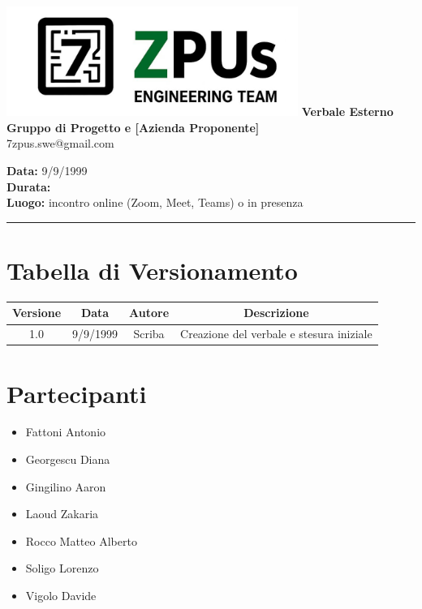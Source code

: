 \documentclass[a4paper,12pt]{article}
\begin{document}
\begin{center}
    \includegraphics[width=9.5cm]{../../images/logo7ZPUs2.jpg}
    \Large \textbf{Verbale Esterno Gruppo di Progetto e [Azienda Proponente]}\\
    \vspace{0.5cm}
    \small\hspace{10cm} 7zpus.swe@gmail.com
\end{center}


\noindent
\textbf{Data:} 9/9/1999 \\
\textbf{Durata:}  \\
\textbf{Luogo:} incontro online (Zoom, Meet, Teams) o in presenza

\vspace{0.3cm}
\hrule
\vspace{0.5cm}

\tableofcontents

\newpage

\section{Tabella di Versionamento}
    \begin{tabular}{|c|c|c|c|}
        \hline
        \textbf{Versione} & \textbf{Data} & \textbf{Autore} & \textbf{Descrizione} \\
        \hline
        1.0 & 9/9/1999 & Scriba & Creazione del verbale e stesura iniziale \\

        \hline
    \end{tabular}


\section{Partecipanti}
\begin{itemize}[noitemsep]
    \item Fattoni Antonio 
    \item Georgescu Diana
    \item Gingilino Aaron
    \item Laoud Zakaria
    \item Rocco Matteo Alberto
    \item Soligo Lorenzo
    \item Vigolo Davide
\end{itemize}
\end{document}
